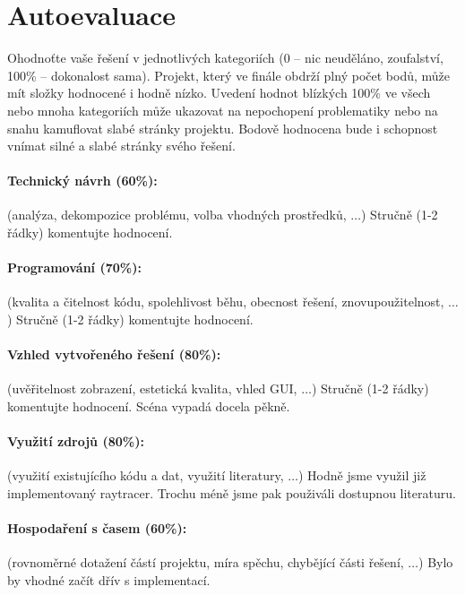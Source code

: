 \documentclass[12pt,a4paper,titlepage,final]{report}
\begin{document}
\section{Autoevaluace}

Ohodnoťte vaše řešení v jednotlivých kategoriích (0 – nic neuděláno,
zoufalství, 100\% – dokonalost sama). Projekt, který ve finále obdrží plný
počet bodů, může mít složky hodnocené i hodně nízko. Uvedení hodnot blízkých
100\% ve všech nebo mnoha kategoriích může ukazovat na nepochopení problematiky
nebo na snahu kamuflovat slabé stránky projektu. Bodově hodnocena bude i
schopnost vnímat silné a slabé stránky svého řešení.

\paragraph{Technický návrh (60\%):} (analýza, dekompozice problému, volba
vhodných prostředků, $\ldots$) 
Stručně (1-2 řádky) komentujte hodnocení. 

\paragraph{Programování (70\%):} (kvalita a čitelnost kódu, spolehlivost běhu,
obecnost řešení, znovupoužitelnost, $\ldots$)
Stručně (1-2 řádky) komentujte hodnocení. 

\paragraph{Vzhled vytvořeného řešení (80\%):} (uvěřitelnost zobrazení,
estetická kvalita, vhled GUI, $\ldots$)
Stručně (1-2 řádky) komentujte hodnocení. 
Scéna vypadá docela pěkně.

\paragraph{Využití zdrojů (80\%):} (využití existujícího kódu a dat, využití
literatury, $\ldots$)
Hodně jsme využil již implementovaný raytracer. Trochu méně jsme pak použiváli dostupnou literaturu.

\paragraph{Hospodaření s časem (60\%):} (rovnoměrné dotažení částí projektu,
míra spěchu, chybějící části řešení, $\ldots$)
Bylo by vhodné začít dřív s implementací.
\end{document}

